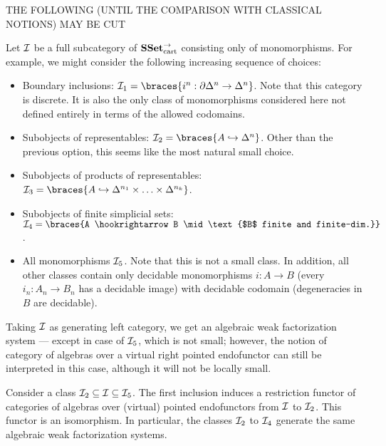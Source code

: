 \documentclass[reqno,10pt,a4paper,oneside]{amsart}
\begin{document}
THE FOLLOWING (UNTIL THE COMPARISON WITH CLASSICAL NOTIONS) MAY BE CUT

Let $\cal{I}$ be a full subcategory of $\SSetCart$ consisting only of monomorphisms.
For example, we might consider the following increasing sequence of choices:
\begin{itemize}
\item
Boundary inclusions: $\cal{I}_1 = \braces{i^n : \partial \Delta^n \to \Delta^n}$.
Note that this category is discrete.
It is also the only class of monomorphisms considered here not defined entirely in terms of the allowed codomains.
\item
Subobjects of representables: $\cal{I}_2 = \braces{A \hookrightarrow \Delta^n}$.
Other than the previous option, this seems like the most natural small choice.
\item
Subobjects of products of representables: $\cal{I}_3 = \braces{A \hookrightarrow \Delta^{n_1} \times \ldots \times \Delta^{n_k}}$.
\item
Subobjects of finite simplicial sets: $\cal{I}_4 = \braces{A \hookrightarrow B \mid \text{$B$ finite and finite-dim.}}$.
\item
All monomorphisms $\cal{I}_5$.
Note that this is not a small class.
In addition, all other classes contain only decidable monomorphisms $i : A \to B$ (\ie every $i_n : A_n \to B_n$ has a decidable image) with decidable codomain (\ie degeneracies in $B$ are decidable).
\end{itemize}

Taking $\cal{I}$ as generating left category, we get an algebraic weak factorization system --- except in case of $\cal{I}_5$, which is not small; however, the notion of category of algebras over a virtual right pointed endofunctor can still be interpreted in this case, although it will not be locally small.



\begin{lemma}
Consider a class $\cal{I}_2 \subseteq \cal{I} \subseteq \cal{I}_5$.
The first inclusion induces a restriction functor of categories of algebras over (virtual) pointed endofunctors from $\cal{I}$ to $\cal{I}_2$.
This functor is an isomorphism.
In particular, the classes $\cal{I}_2$ to $\cal{I}_4$ generate the same algebraic weak factorization systems.
\end{lemma}
\end{document}
